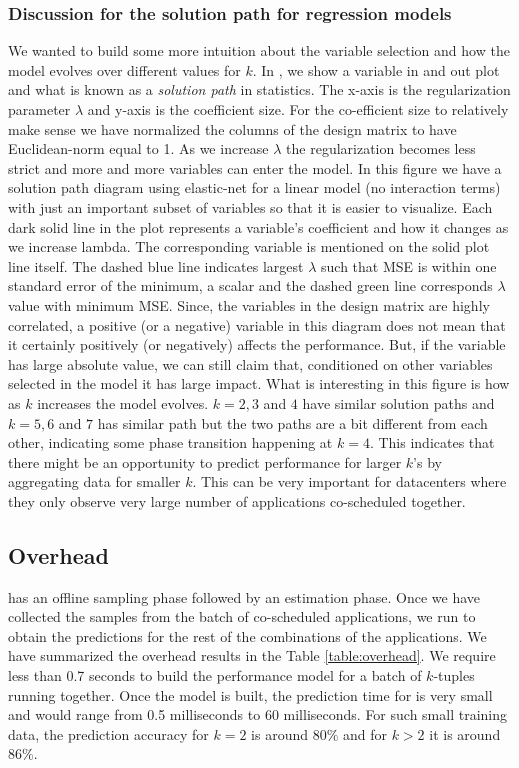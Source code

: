 \subsubsection{Discussion for the solution path for regression models}
We wanted to build some more intuition about the variable selection
and how the model evolves over different values for $k$. In
, we show a variable in and out plot and
what is known as a \textit{solution path} in statistics. The x-axis is
the regularization parameter $\lambda$ and y-axis is the coefficient
size. For the co-efficient size to relatively make sense we have
normalized the columns of the design matrix to have Euclidean-norm
equal to 1. As we increase $\lambda$ the regularization becomes less
strict and more and more variables can enter the model. In this figure
we have a solution path diagram using elastic-net for a linear model
(no interaction terms) with just an important subset of variables so
that it is easier to visualize.  Each dark solid line in the plot
represents a variable's coefficient and how it changes as we increase
lambda.  The corresponding variable is mentioned on the solid plot
line itself. The dashed blue line indicates largest $\lambda$ such
that MSE is within one standard error of the minimum, a scalar and the
dashed green line corresponds $\lambda$ value with minimum MSE.
Since, the variables in the design matrix are highly correlated, a
positive (or a negative) variable in this diagram does not mean that
it certainly positively (or negatively) affects the performance. But,
if the variable has large absolute value, we can still claim that,
conditioned on other variables selected in the model it has large
impact. What is interesting in this figure is how as $k$ increases the
model evolves. $k=2, 3$ and $4$ have similar solution paths and $k=5,
6$ and $7$ has similar path but the two paths are a bit different from
each other, indicating some phase transition happening at $k=4$. This
indicates that there might be an opportunity to predict performance
for larger $k$'s by aggregating data for smaller $k$. This can be very
important for datacenters where they only observe very large number of
applications co-scheduled together.



\subsection{Overhead}
\label{sec:expt:overhead}
\SYSTEM{} has an offline sampling phase followed by an
estimation phase. Once we have collected the samples from the batch of
co-scheduled applications, we run \SYSTEM{} to obtain the predictions
for the rest of the combinations of the applications. We have
summarized the overhead results in the Table \ref{table:overhead}. We
require less than 0.7 seconds to build the performance model for a
batch of $k$-tuples running together. Once the model is built, the
prediction time for \SYSTEM{} is very small and would range from 0.5
milliseconds to 60 milliseconds. For such small training data, the
prediction accuracy for $k=2$ is around $80\%$ and for $k>2$ it is
around $86\%$.

